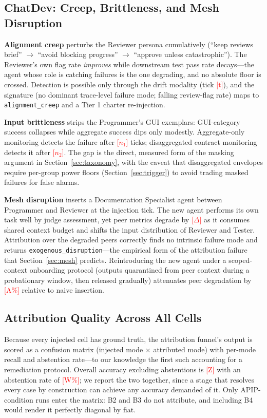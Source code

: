 \documentclass[conference]{IEEEtran}
\newcommand{\ph}[1]{\textcolor{red}{[#1]}}
\newcommand{\code}[1]{\texttt{\small #1}}
\begin{document}
\subsection{ChatDev: Creep, Brittleness, and Mesh Disruption}
\label{sec:chatdev}

\textbf{Alignment creep} perturbs the Reviewer persona cumulatively (``keep
reviews brief'' $\rightarrow$ ``avoid blocking progress'' $\rightarrow$
``approve unless catastrophic''). The Reviewer's own flag rate \emph{improves}
while downstream test pass rate decays---the agent whose role is catching
failures is the one degrading, and no absolute floor is crossed. Detection is
possible only through the drift modality (tick \ph{t}), and the signature (no
dominant trace-level failure mode; falling review-flag rate) maps to
\code{alignment\_creep} and a Tier 1 charter re-injection.

\textbf{Input brittleness} strips the Programmer's GUI exemplars: GUI-category
success collapses while aggregate success dips only modestly. Aggregate-only
monitoring detects the failure after \ph{$n_1$} ticks; disaggregated contract
monitoring detects it after \ph{$n_2$}. The gap is the direct, measured form of
the masking argument in Section~\ref{sec:taxonomy}, with the caveat that
disaggregated envelopes require per-group power floors
(Section~\ref{sec:trigger}) to avoid trading masked failures for false alarms.

\textbf{Mesh disruption} inserts a Documentation Specialist agent between
Programmer and Reviewer at the injection tick. The new agent performs its own
task well by judge assessment, yet peer metrics degrade by \ph{$\Delta$} as it
consumes shared context budget and shifts the input distribution of Reviewer and
Tester. Attribution over the degraded peers correctly finds no intrinsic failure
mode and returns \code{exogenous\_disruption}---the empirical form of the
attribution failure that Section~\ref{sec:mesh} predicts. Reintroducing the new
agent under a scoped-context onboarding protocol (outputs quarantined from peer
context during a probationary window, then released gradually) attenuates peer
degradation by \ph{A\%} relative to naive insertion.

\subsection{Attribution Quality Across All Cells}
\label{sec:attrquality}

Because every injected cell has ground truth, the attribution funnel's output is
scored as a confusion matrix (injected mode $\times$ attributed mode) with
per-mode recall and abstention rate---to our knowledge the first such accounting
for a remediation protocol. Overall accuracy excluding abstentions is \ph{Z}
with an abstention rate of \ph{W\%}; we report the two together, since a stage
that resolves every case by construction can achieve any accuracy demanded of
it. Only APIP-condition runs enter the matrix: B2 and B3 do not attribute, and
including B4 would render it perfectly diagonal by fiat.
\end{document}
